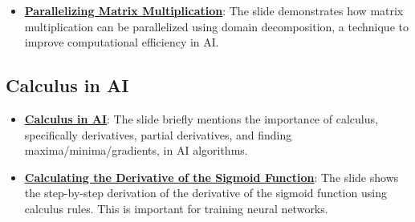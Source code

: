 \documentclass{article}%
\begin{document}
\begin{itemize}[leftmargin=*]
\item \href{\url{https://purdue.brightspace.com/d2l/common/assets/pdfjs-d2l-dist/1.0.14-legacy/web/viewer.html?file=\%252Fcontent\%252Fenforced\%252F1095467-wl.202510.CS.24300.001\%252F04L1-Linear\%20Algebra\%20Primer.pdf\%253Fou\%253D1095467\&lang=en-us\&container=d2l-fileviewer-rendered-pdf\&fullscreen=d2l-fileviewer-rendered-pdf-dialog\&height=667}#page=18}{\textbf{Parallelizing Matrix Multiplication}}: The slide demonstrates how matrix multiplication can be parallelized using domain decomposition, a technique to improve computational efficiency in AI.%
\end{itemize}

%
\subsection{Calculus in AI}%
\label{subsec:CalculusinAI}%
\begin{itemize}[leftmargin=*]%
\item \href{\url{https://purdue.brightspace.com/d2l/common/assets/pdfjs-d2l-dist/1.0.14-legacy/web/viewer.html?file=\%252Fcontent\%252Fenforced\%252F1095467-wl.202510.CS.24300.001\%252F04L1-Linear\%20Algebra\%20Primer.pdf\%253Fou\%253D1095467\&lang=en-us\&container=d2l-fileviewer-rendered-pdf\&fullscreen=d2l-fileviewer-rendered-pdf-dialog\&height=667}#page=19}{\textbf{Calculus in AI}}: The slide briefly mentions the importance of calculus, specifically derivatives, partial derivatives, and finding maxima/minima/gradients, in AI algorithms.%
\item \href{\url{https://purdue.brightspace.com/d2l/common/assets/pdfjs-d2l-dist/1.0.14-legacy/web/viewer.html?file=\%252Fcontent\%252Fenforced\%252F1095467-wl.202510.CS.24300.001\%252F04L1-Linear\%20Algebra\%20Primer.pdf\%253Fou\%253D1095467\&lang=en-us\&container=d2l-fileviewer-rendered-pdf\&fullscreen=d2l-fileviewer-rendered-pdf-dialog\&height=667}#page=21}{\textbf{Calculating the Derivative of the Sigmoid Function}}: The slide shows the step-by-step derivation of the derivative of the sigmoid function using calculus rules. This is important for training neural networks.%
\end{itemize}

%
\end{document}
